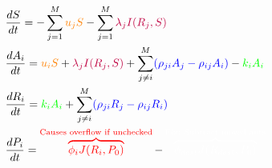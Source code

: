 \documentclass[letterpaper]{article}
\makeatletter
\def\mcolor#1#{\@mcolor{#1}}
\def\@mcolor#1#2#3{%
  \protect\leavevmode
  \begingroup
    \color#1{#2}#3%
  \endgroup
}
\newcommand{\annotate}[3]{
\mcolor{#1}{\overbrace{#3}^\text{#2}}
}
\makeatother
\begin{document}
      \Large
      \begin{equation}
      \begin{aligned}
          & \frac{dS}{dt} = - \sum_{j=1}^M \mcolor{orange}{u_jS} - \sum_{j=1}^M \mcolor{purple}{\lambda_jI(R_j, S)} \\
          & \frac{dA_i}{dt} = \mcolor{orange}{u_iS} + \mcolor{purple}{\lambda_jI(R_j, S)} + \sum_{j \neq i}^M \mcolor{blue}{(\rho_{ji}A_j - \rho_{ij}A_i)} - \mcolor{green}{k_iA_i} \\
          & \frac{dR_i}{dt} = \mcolor{green}{k_iA_i} + \sum_{j \neq i}^M \mcolor{blue}{(\rho_{ji}R_j - \rho_{ij}R_i)} \\
          & \frac{dP_i}{dt} = \annotate{red}{Causes overflow if unchecked}{\phi_iJ(R_i, P_0)} - \annotate{white}{Fix: Subtract moved ants}{\phi_{dest}J(R_{dest},P_0)}
      \end{aligned}
      \end{equation}
\end{document}
